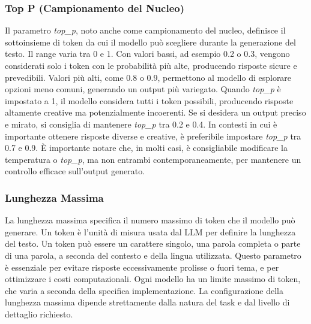 \documentclass[target=mst,aauheader=,style=]{thud}
\begin{document}
\subsubsection{Top P (Campionamento del Nucleo)}
Il parametro \textit{top\_p}, noto anche come campionamento del nucleo, definisce il sottoinsieme di token da cui il modello può scegliere durante la generazione del testo. Il range varia tra 0 e 1. Con valori bassi, ad esempio 0.2 o 0.3, vengono considerati solo i token con le probabilità più alte, producendo risposte sicure e prevedibili. Valori più alti, come 0.8 o 0.9, permettono al modello di esplorare opzioni meno comuni, generando un output più variegato.
Quando \textit{top\_p} è impostato a 1, il modello considera tutti i token possibili, producendo risposte altamente creative ma potenzialmente incoerenti. Se si desidera un output preciso e mirato, si consiglia di mantenere \textit{top\_p} tra 0.2 e 0.4. In contesti in cui è importante ottenere risposte diverse e creative, è preferibile impostare \textit{top\_p} tra 0.7 e 0.9. È importante notare che, in molti casi, è consigliabile modificare la temperatura o \textit{top\_p}, ma non entrambi contemporaneamente, per mantenere un controllo efficace sull’output generato.

\subsubsection{Lunghezza Massima}
La lunghezza massima specifica il numero massimo di token che il modello può generare. Un token è l’unità di misura usata dal LLM per definire la lunghezza del testo. Un token può essere un carattere singolo, una parola completa o parte di una parola, a seconda del contesto e della lingua utilizzata. Questo parametro è essenziale per evitare risposte eccessivamente prolisse o fuori tema, e per ottimizzare i costi computazionali. Ogni modello ha un limite massimo di token, che varia a seconda della specifica implementazione. La configurazione della lunghezza massima dipende strettamente dalla natura del task e dal livello di dettaglio richiesto.
\end{document}

